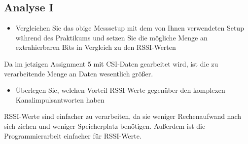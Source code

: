 \subsection{Analyse I}


\begin{itemize}
    \item Vergleichen Sie das obige Messsetup mit dem von 
    Ihnen verwendeten Setup während des
    Praktikums und setzen Sie die mögliche Menge an 
    extrahierbaren Bits in Vergleich zu den
    RSSI-Werten
\end{itemize}

Da im jetzigen Assignment 5 mit CSI-Daten gearbeitet wird,
ist die zu verarbeitende Menge an Daten wesentlich größer.

\begin{itemize}
    \item Überlegen Sie, welchen Vorteil RSSI-Werte 
    gegenüber den komplexen Kanalimpulsantworten
    haben
\end{itemize}

RSSI-Werte sind einfacher zu verarbeiten, da sie weniger 
Rechenaufwand nach sich ziehen und weniger Speicherplatz 
benötigen. Außerdem ist die Programmierarbeit einfacher 
für RSSI-Werte.

